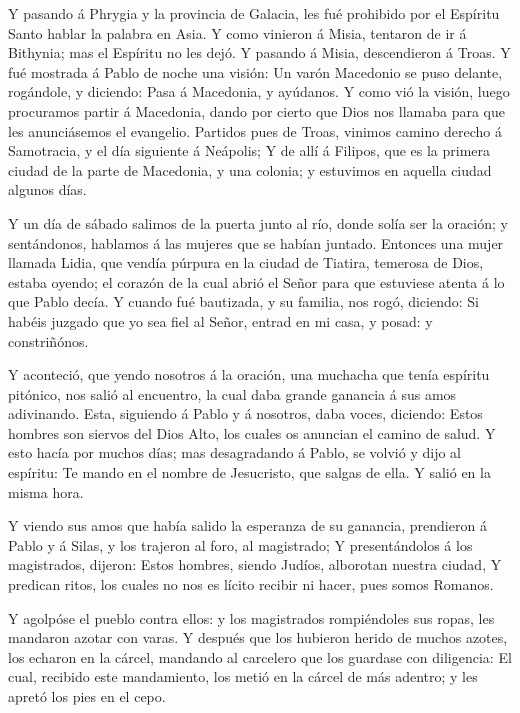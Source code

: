  Y pasando á Phrygia y la provincia de Galacia, les fué
prohibido por el Espíritu Santo hablar la palabra en Asia. 
Y como vinieron á Misia, tentaron de ir á Bithynia; mas el Espíritu no
les dejó.  Y pasando á Misia, descendieron á Troas.
 Y fué mostrada á Pablo de noche una visión: Un varón
Macedonio se puso delante, rogándole, y diciendo: Pasa á Macedonia, y
ayúdanos.  Y como vió la visión, luego procuramos partir á
Macedonia, dando por cierto que Dios nos llamaba para que les
anunciásemos el evangelio.  Partidos pues de Troas, vinimos
camino derecho á Samotracia, y el día siguiente á Neápolis;
 Y de allí á Filipos, que es la primera ciudad de la parte
de Macedonia, y una colonia; y estuvimos en aquella ciudad algunos días.

 Y un día de sábado salimos de la puerta junto al río,
donde solía ser la oración; y sentándonos, hablamos á las mujeres que se
habían juntado.  Entonces una mujer llamada Lidia, que
vendía púrpura en la ciudad de Tiatira, temerosa de Dios, estaba oyendo;
el corazón de la cual abrió el Señor para que estuviese atenta á lo que
Pablo decía.  Y cuando fué bautizada, y su familia, nos
rogó, diciendo: Si habéis juzgado que yo sea fiel al Señor, entrad en mi
casa, y posad: y constriñónos.

 Y aconteció, que yendo nosotros á la oración, una muchacha
que tenía espíritu pitónico, nos salió al encuentro, la cual daba grande
ganancia á sus amos adivinando.  Esta, siguiendo á Pablo y
á nosotros, daba voces, diciendo: Estos hombres son siervos del Dios
Alto, los cuales os anuncian el camino de salud.  Y esto
hacía por muchos días; mas desagradando á Pablo, se volvió y dijo al
espíritu: Te mando en el nombre de Jesucristo, que salgas de ella. Y
salió en la misma hora.

 Y viendo sus amos que había salido la esperanza de su
ganancia, prendieron á Pablo y á Silas, y los trajeron al foro, al
magistrado;  Y presentándolos á los magistrados, dijeron:
Estos hombres, siendo Judíos, alborotan nuestra ciudad,  Y
predican ritos, los cuales no nos es lícito recibir ni hacer, pues somos
Romanos.

 Y agolpóse el pueblo contra ellos: y los magistrados
rompiéndoles sus ropas, les mandaron azotar con varas.  Y
después que los hubieron herido de muchos azotes, los echaron en la
cárcel, mandando al carcelero que los guardase con diligencia:
 El cual, recibido este mandamiento, los metió en la cárcel
de más adentro; y les apretó los pies en el cepo.

